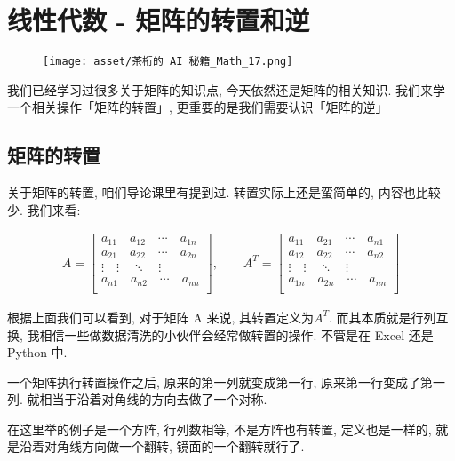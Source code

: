 \chapter{线性代数 - 矩阵的转置和逆}

\begin{figure}[ht]
  \centering
  \texttt{[image: asset/茶桁的 AI 秘籍\_Math\_17.png]}
\end{figure}

\newpage

我们已经学习过很多关于矩阵的知识点, 今天依然还是矩阵的相关知识. 我们来学一个相关操作「矩阵的转置」, 更重要的是我们需要认识「矩阵的逆」

\section{矩阵的转置}

关于矩阵的转置, 咱们导论课里有提到过. 转置实际上还是蛮简单的, 内容也比较少. 我们来看: 

\begin{align*}
  A = \begin{bmatrix}
  a_{11} \quad a_{12} \quad \cdots \quad a_{1n} \\
  a_{21} \quad a_{22} \quad \cdots \quad a_{2n} \\
  \vdots \quad \vdots \quad \ddots \quad \vdots \\
  a_{n1} \quad a_{n2} \quad \cdots \quad a_{nn} \\
  \end{bmatrix}, \qquad 
  A^T = \begin{bmatrix}
  a_{11} \quad a_{21} \quad \cdots \quad a_{n1} \\
  a_{12} \quad a_{22} \quad \cdots \quad a_{n2} \\
  \vdots \quad \vdots \quad \ddots \quad \vdots \\
  a_{1n} \quad a_{2n} \quad \cdots \quad a_{nn} \\
  \end{bmatrix}
\end{align*}

根据上面我们可以看到, 对于矩阵 A 来说, 其转置定义为\(A^T\). 而其本质就是行列互换, 我相信一些做数据清洗的小伙伴会经常做转置的操作. 不管是在 Excel 还是 Python 中. 

一个矩阵执行转置操作之后, 原来的第一列就变成第一行, 原来第一行变成了第一列. 就相当于沿着对角线的方向去做了一个对称. 

在这里举的例子是一个方阵, 行列数相等, 不是方阵也有转置, 定义也是一样的, 就是沿着对角线方向做一个翻转, 镜面的一个翻转就行了. 

